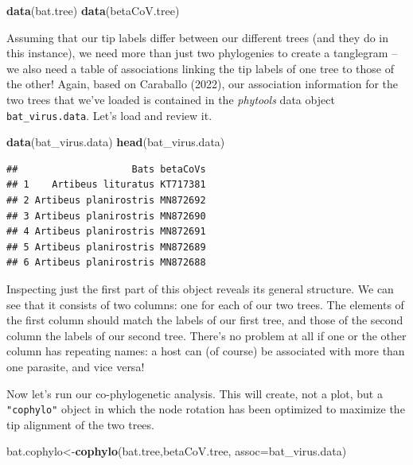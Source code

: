 \documentclass[fleqn,10pt,lineno]{wlpeerj} %
\newenvironment{Shaded}{\begin{snugshade}}{\end{snugshade}}
\newcommand{\AttributeTok}[1]{\textcolor[rgb]{0.13,0.29,0.53}{#1}}
\newcommand{\FunctionTok}[1]{\textcolor[rgb]{0.13,0.29,0.53}{\textbf{#1}}}
\newcommand{\NormalTok}[1]{#1}
\newcommand{\OtherTok}[1]{\textcolor[rgb]{0.56,0.35,0.01}{#1}}
\begin{document}
\begin{Shaded}
\begin{Highlighting}[]
\FunctionTok{data}\NormalTok{(bat.tree)}
\FunctionTok{data}\NormalTok{(betaCoV.tree)}
\end{Highlighting}
\end{Shaded}

Assuming that our tip labels differ between our different trees (and they do in this instance), we need more than just two phylogenies to create a tanglegram -- we also need a table of associations linking the tip labels of one tree to those of the other! Again, based on Caraballo (2022), our association information for the two trees that we've loaded is contained in the \emph{phytools} data object \texttt{bat\_virus.data}. Let's load and review it.

\begin{Shaded}
\begin{Highlighting}[]
\FunctionTok{data}\NormalTok{(bat\_virus.data)}
\FunctionTok{head}\NormalTok{(bat\_virus.data)}
\end{Highlighting}
\end{Shaded}

\begin{verbatim}
##                    Bats betaCoVs
## 1    Artibeus lituratus KT717381
## 2 Artibeus planirostris MN872692
## 3 Artibeus planirostris MN872690
## 4 Artibeus planirostris MN872691
## 5 Artibeus planirostris MN872689
## 6 Artibeus planirostris MN872688
\end{verbatim}

Inspecting just the first part of this object reveals its general structure. We can see that it consists of two columns: one for each of our two trees. The elements of the first column should match the labels of our first tree, and those of the second column the labels of our second tree. There's no problem at all if one or the other column has repeating names: a host can (of course) be associated with more than one parasite, and vice versa!

Now let's run our co-phylogenetic analysis. This will create, not a plot, but a \texttt{"cophylo"} object in which the node rotation has been optimized to maximize the tip alignment of the two trees.

\begin{Shaded}
\begin{Highlighting}[]
\NormalTok{bat.cophylo}\OtherTok{\textless{}{-}}\FunctionTok{cophylo}\NormalTok{(bat.tree,betaCoV.tree,}
  \AttributeTok{assoc=}\NormalTok{bat\_virus.data)}
\end{Highlighting}
\end{Shaded}
\end{document}
